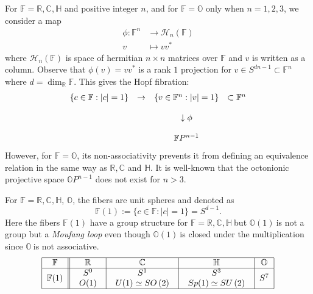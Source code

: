 \documentclass[a4paper]{article}%
\begin{document}
For $\mathbb{F}=\mathbb{R},\mathbb{C},\mathbb{H}$ and positive integer $n$,
and for $\mathbb{F}=\mathbb{O}$ only when $n=1,2,3$, we consider a map
\begin{align*}
\phi:\mathbb{F}^{n}  &  \rightarrow\mathcal{H}_{n}(\mathbb{F})\\
v  &  \mapsto vv^{\ast}%
\end{align*}
where $\mathcal{H}_{n}(\mathbb{F})$ is space of hermitian $n\times n$ matrices
over $\mathbb{F}$ and $v$ is written as a column. Observe that $\phi
(v)=vv^{\ast}$ is a rank $1$ projection for $v\in S^{dn-1}\subset
\mathbb{F}^{n}$ where $d=\dim_{\mathbb{R}}\mathbb{F}$. This gives the Hopf
fibration:%
\[%
\begin{array}
[c]{cccc}%
\{c\in\mathbb{F}:|c|=1\} & \rightarrow & \{v\in\mathbb{F}^{n}:|v|=1\} &
\subset\mathbb{F}^{n}\\
&  &  & \\
&  & \downarrow\phi & \\
&  &  & \\
&  & \mathbb{F}P^{n-1} &
\end{array}
\]
However, for $\mathbb{F}=\mathbb{O}$, its non-associativity prevents it from
defining an equivalence relation in the same way as $\mathbb{R},\mathbb{C}$
and $\mathbb{H}$. It is well-known that the octonionic projective space
$\mathbb{O}P^{n-1}$ does not exist for $n>3$.

For $\mathbb{F}=\mathbb{R},\mathbb{C},\mathbb{H}$, $\mathbb{O}$, the fibers
are unit spheres and denoted as
\[
\mathbb{F}(1):=\{c\in\mathbb{F}:|c|=1\}=S^{d-1}.
\]
Here the fibers $\mathbb{F}(1)$ have a group structure for $\mathbb{F}%
=\mathbb{R},\mathbb{C},\mathbb{H\ }$but $\mathbb{O}(1)\ $is not a group but a
\textit{Moufang loop} even though $\mathbb{O}(1)\ $is closed under the
multiplication since $\mathbb{O\ }$is not associative.
\[%
\begin{tabular}
[c]{|c||c|c|c|c|}\hline
$\mathbb{F}$ & $\mathbb{R}$ & $\mathbb{C}$ & $\mathbb{H}$ & $\mathbb{O}%
$\\\hline
$\mathbb{F}(1)$ & $%
\begin{array}
[c]{c}%
S^{0}\\
O(1)
\end{array}
$ & $%
\begin{array}
[c]{c}%
S^{1}\\
U(1)\simeq SO\left(  2\right)
\end{array}
$ & $%
\begin{array}
[c]{c}%
S^{3}\\
Sp(1)\simeq SU\left(  2\right)
\end{array}
$ & $S^{7}$\\\hline
\end{tabular}
\]
\end{document}
